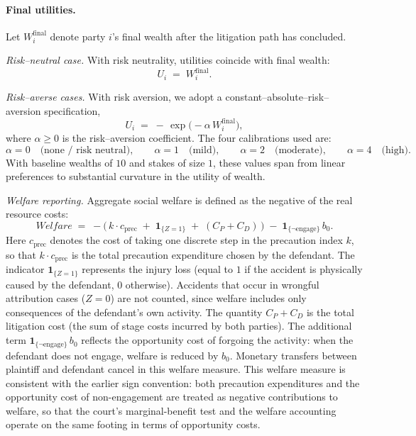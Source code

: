 \documentclass{article}
\begin{document}
\paragraph{Final utilities.}
Let $W_i^{\mathrm{final}}$ denote party $i$'s final wealth after the litigation path has concluded.

\emph{Risk–neutral case.} With risk neutrality, utilities coincide with final wealth:
\[
U_i \;=\; W_i^{\mathrm{final}}.
\]

\emph{Risk–averse cases.} With risk aversion, we adopt a constant–absolute–risk–aversion specification,
\[
U_i \;=\; -\,\exp\!\bigl(-\alpha\,W_i^{\mathrm{final}}\bigr),
\]
where $\alpha\ge 0$ is the risk–aversion coefficient. The four calibrations used are:
\[
\alpha = 0 \quad\text{(none / risk neutral)},\qquad
\alpha = 1 \quad\text{(mild)},\qquad
\alpha = 2 \quad\text{(moderate)},\qquad
\alpha = 4 \quad\text{(high)}.
\]
With baseline wealths of $10$ and stakes of size $1$, these values span from linear preferences to substantial curvature in the utility of wealth.

\emph{Welfare reporting.} Aggregate social welfare is defined as the negative of the real resource costs:
\[
Welfare \;=\; -\bigl(\,k \cdot c_{\mathrm{prec}} \;+\; \mathbf{1}_{\{Z=1\}} \;+\; (C_P+C_D)\,\bigr)
\;-\;\mathbf{1}_{\{\neg \text{engage}\}}\,b_0.
\]
Here $c_{\mathrm{prec}}$ denotes the cost of taking one discrete step in the precaution index $k$, so that $k \cdot c_{\mathrm{prec}}$ is the total precaution expenditure chosen by the defendant. The indicator $\mathbf{1}_{\{Z=1\}}$ represents the injury loss (equal to $1$ if the accident is physically caused by the defendant, $0$ otherwise). Accidents that occur in wrongful attribution cases ($Z=0$) are not counted, since welfare includes only consequences of the defendant’s own activity. The quantity $C_P+C_D$ is the total litigation cost (the sum of stage costs incurred by both parties). The additional term $\mathbf{1}_{\{\neg \text{engage}\}}\,b_0$ reflects the opportunity cost of forgoing the activity: when the defendant does not engage, welfare is reduced by $b_0$. Monetary transfers between plaintiff and defendant cancel in this welfare measure. This welfare measure is consistent with the earlier sign convention: both precaution expenditures and the opportunity cost of non-engagement are treated as negative contributions to welfare, so that the court’s marginal-benefit test and the welfare accounting operate on the same footing in terms of opportunity costs.
\end{document}
